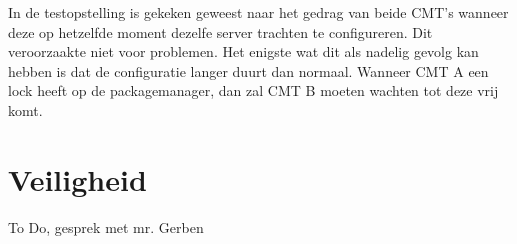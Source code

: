 In de testopstelling is gekeken geweest naar het gedrag van beide \gls{CMT}'s wanneer deze op hetzelfde moment dezelfe server trachten te configureren. Dit veroorzaakte niet voor problemen.
Het enigste wat dit als nadelig gevolg kan hebben is dat de configuratie langer duurt dan normaal. Wanneer \gls{CMT} A een lock heeft op de \gls{packagemanager}, dan zal \gls{CMT} B moeten wachten tot deze vrij komt. 



\section{Veiligheid}

To Do, gesprek met mr. Gerben
